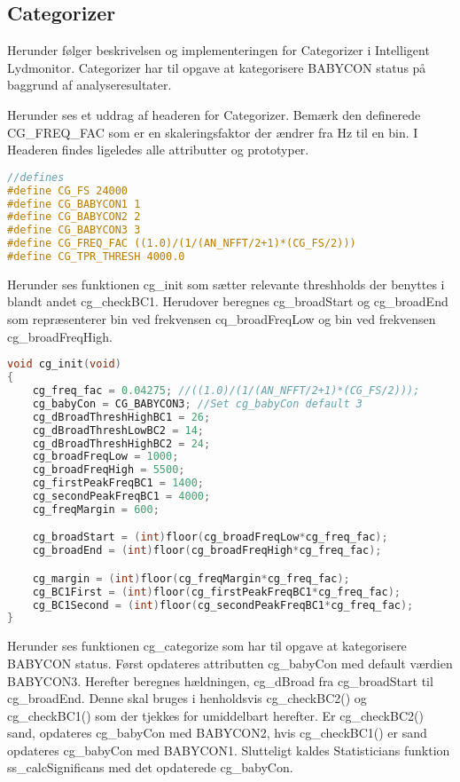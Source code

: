 \subsection*{Categorizer}
Herunder følger beskrivelsen og implementeringen for Categorizer i Intelligent Lydmonitor.
Categorizer har til opgave at kategorisere BABYCON status på baggrund af analyseresultater. 


Herunder ses et uddrag af headeren for Categorizer. Bemærk den definerede CG\_FREQ\_FAC som er en skaleringsfaktor der ændrer fra Hz til en bin. I Headeren findes ligeledes alle attributter og prototyper.

\begin{lstlisting}[language=C,numbers=none]
//defines
#define CG_FS 24000
#define CG_BABYCON1 1
#define CG_BABYCON2 2
#define CG_BABYCON3 3
#define CG_FREQ_FAC ((1.0)/(1/(AN_NFFT/2+1)*(CG_FS/2)))
#define CG_TPR_THRESH 4000.0
\end{lstlisting}

Herunder ses funktionen cg\_init som sætter relevante threshholds der benyttes i blandt andet cg\_checkBC1. Herudover beregnes cg\_broadStart og cg\_broadEnd som repræsenterer bin ved frekvensen cq\_broadFreqLow og bin ved frekvensen cg\_broadFreqHigh. 

\begin{lstlisting}[language=C,numbers=none]
void cg_init(void)
{
    cg_freq_fac = 0.04275; //((1.0)/(1/(AN_NFFT/2+1)*(CG_FS/2)));
    cg_babyCon = CG_BABYCON3; //Set cg_babyCon default 3
    cg_dBroadThreshHighBC1 = 26;
    cg_dBroadThreshLowBC2 = 14;
    cg_dBroadThreshHighBC2 = 24;
    cg_broadFreqLow = 1000;
    cg_broadFreqHigh = 5500;
    cg_firstPeakFreqBC1 = 1400;
    cg_secondPeakFreqBC1 = 4000;
    cg_freqMargin = 600;

    cg_broadStart = (int)floor(cg_broadFreqLow*cg_freq_fac);
    cg_broadEnd = (int)floor(cg_broadFreqHigh*cg_freq_fac);

    cg_margin = (int)floor(cg_freqMargin*cg_freq_fac);
    cg_BC1First = (int)floor(cg_firstPeakFreqBC1*cg_freq_fac);
    cg_BC1Second = (int)floor(cg_secondPeakFreqBC1*cg_freq_fac);
}
\end{lstlisting}

Herunder ses funktionen cg\_categorize som har til opgave at kategorisere BABYCON status. 
Først opdateres attributten cg\_babyCon med default værdien BABYCON3. 
Herefter beregnes hældningen, cg\_dBroad fra cg\_broadStart til cg\_broadEnd. Denne skal bruges i henholdsvis cg\_checkBC2() og cg\_checkBC1() som der tjekkes for umiddelbart herefter. Er cg\_checkBC2() sand, opdateres cg\_babyCon med BABYCON2, hvis cg\_checkBC1() er sand opdateres cg\_babyCon med BABYCON1.
Slutteligt kaldes Statisticians funktion ss\_calcSignificans med det opdaterede cg\_babyCon.

